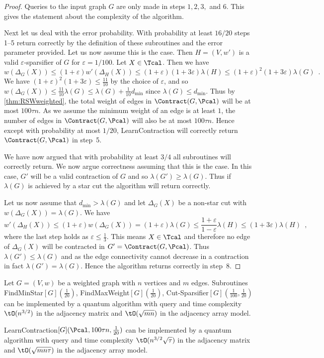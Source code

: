 \begin{proof}
Queries to the input graph $G$ are only made in steps $1,2,3,$ and $6$. This gives the statement about the complexity of the algorithm.  

Next let us deal with the error probability.  With probability at least $16/20$ steps 1--5 return correctly by the definition of these subroutines and 
the error parameter provided.  Let us now assume this is the case.   Then $H =(V,w')$ is a valid $\varepsilon$-sparsifier of $G$ for $\varepsilon = 1/100$.  
Let $X \in \Tcal$.  Then we have 
\[
w(\Delta_G(X)) \le (1+\varepsilon) w'(\Delta_H(X)) \le (1+\varepsilon)(1+3\varepsilon)\lambda(H) \le (1+\varepsilon)^2(1+3\varepsilon)\lambda(G) \enspace .
\]
We have $(1+\varepsilon)^2(1+3\varepsilon) \le \frac{11}{10}$ by the choice of $\varepsilon$, and so $w(\Delta_G(X)) \leq \frac{11}{10} \lambda(G) \leq \lambda(G) + \frac{1}{10} d_{\min}$ 
since $\lambda(G) \le d_{\min}$.  Thus by \cref{thm:RSWweighted}, the total weight of edges in $\Contract(G, \Pcal)$ will be at most $100\tau n$.
As we assume the minimum weight of an edge is at least $1$, the number of edges in $\Contract(G, \Pcal)$ will also be at most $100\tau n$. 
Hence except with probability at most $1/20$, LearnContraction will correctly return $\Contract(G, \Pcal)$ in step~5.

We have now argued that with probability at least $3/4$ all subroutines will correctly return.  We now argue correctness assuming that this is the case.  
In this case, $G'$ will be a valid contraction of $G$ and so $\lambda(G') \ge \lambda(G)$.  Thus if $\lambda(G)$ is achieved by a star cut the 
algorithm will return correctly.  

Let us now assume that $d_{\min} > \lambda(G)$ and let $\Delta_G(X)$ be a non-star cut with $w(\Delta_G(X)) = \lambda(G)$.  We have 
\[
w'(\Delta_H(X)) \le (1+\varepsilon) w(\Delta_G(X)) = (1+\varepsilon) \lambda(G) \le \frac{1+\varepsilon}{1-\varepsilon} \lambda(H) \le (1+3\varepsilon) \lambda(H)\enspace ,
\]
where the last step holds as $\varepsilon \le \frac{1}{3}$.  This means $X \in \Tcal$ and therefore no edge of $\Delta_G(X)$ will be 
contracted in $G' = \Contract(G,\Pcal)$.  Thus $\lambda(G') \le \lambda(G)$ and as the edge connectivity cannot decrease in a contraction in fact $\lambda(G') = \lambda(G)$.
Hence the algorithm returns correctly in step~8.
\end{proof}

\begin{lemma} \label{lem:compl-subroutines}
Let $G = (V,w)$ be a weighted graph with $n$ vertices and $m$ edges.
Subroutines FindMinStar$[G](\frac{1}{20})$, FindMaxWeight$[G](\frac{1}{20})$, Cut-Sparsifier$[G](\frac{1}{100}, \frac{1}{20})$ can be implemented by a quantum algorithm 
with query and time complexity  $\tO(n^{3/2})$ in the adjacency matrix and $\tO(\sqrt{mn})$ in the adjacency array model.  

LearnContraction$[G](\Pcal, 100 \tau n, \frac{1}{20})$ can be implemented by a quantum algorithm with query and time complexity  
$\tO(n^{3/2}\sqrt{\tau})$ in the adjacency matrix and $\tO(\sqrt{mn\tau})$ in the adjacency array model.
\end{lemma}

